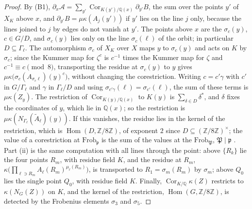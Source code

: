 \documentclass[11pt]{article}
\newcommand{\Z}{\mathbb{Z}}
\newcommand{\Q}{\mathbb{Q}}
\newcommand{\Cor}{\operatorname{Cor}}
\begin{document}
\begin{proof}
By (B1), $\partial_x\mathcal A=\sum_{y'}\Cor_{K(y')/\Q(x)}\partial_{y'}B$, the sum over the points $y'$ of $X_K$ above $x$, and $\partial_{y'}B=\mu\kappa(A_j(y'))$ if $y'$ lies on the line $j$ only, because the lines joined to $j$ by edges do not vanish at $y'$. The points above $x$ are the $\sigma_c(y)$, $c\in G/D$, and $\sigma_c(y)$ lies only on the line $\sigma_c(\ell)$ of the orbit; in particular $D\subseteq\Gamma_\ell$. The automorphism $\sigma_c$ of $X_K$ over $X$ maps $y$ to $\sigma_c(y)$ and acts on $K$ by $\sigma_c$; since the Kummer map for $\zeta^c$ is $c^{-1}$ times the Kummer map for $\zeta$ and $c^{-1}\equiv c\pmod8$, transporting the residue at $\sigma_c(y)$ to $y$ gives $\mu\kappa\bigl(\sigma_c(A_{\sigma_c\ell})(y)^c\bigr)$, without changing the corestriction. Writing $c=c'\gamma$ with $c'$ in $G/\Gamma_\ell$ and $\gamma$ in $\Gamma_\ell/D$ and using $\sigma_{c'\gamma}(\ell)=\sigma_{c'}(\ell)$, the sum of these terms is $\mu\kappa(Z_y)$. The restriction of $\Cor_{K(y)/\Q(x)}$ to $K(y)$ is $\sum_{\delta\in D}\delta^*$, and $\delta$ fixes the coordinates of $y$, which lie in $\Q(x)$; so the restriction is $\mu\kappa(N_{\Gamma_\ell}(\tilde A_\ell)(y))$. If this vanishes, the residue lies in the kernel of the restriction, which is $\operatorname{Hom}(D,\Z/8\Z)$, of exponent $2$ since $D\subseteq(\Z/8\Z)^\times$; the value of a corestriction at $\mathrm{Frob}_{\mathfrak p}$ is the sum of the values at the $\mathrm{Frob}_{\mathfrak P}$, $\mathfrak P\mid\mathfrak p$ \cite{N}. Part (ii) is the same computation with all lines through the point: above $\{R_k\}$ lie the four points $R_m$, with residue field $K$, and the residue at $R_m$, $\kappa\bigl(\prod_{\ell\ni R_m}A_\ell(R_m)^{\mu_\ell(R_m)}\bigr)$, is transported to $R_1=\sigma_m(R_m)$ by $\sigma_m$; above $Q_0$ lies the single point $Q_0$, with residue field $K$. Finally, $\Cor_{K/\Q}\kappa(Z)$ restricts to $\kappa(N_G(Z))$ on $K$, and the kernel of the restriction, $\operatorname{Hom}(G,\Z/8\Z)$, is detected by the Frobenius elements $\sigma_3$ and $\sigma_5$.
\end{proof}
\end{document}
